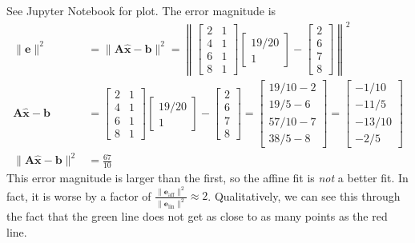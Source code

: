 \documentclass[]{article}
\renewcommand{\vec}[1]{\bm{#1}}
\newcommand{\unit}[1]{\vec{\hat{#1}}}
\begin{document}
See Jupyter Notebook for plot. 
The error magnitude is
\begin{align}
	\|\vec{e}\|^2 &= \|\vec{A} \unit{x} - \vec{b}\|^2 = \left\|\begin{bmatrix}
	2 & 1 \\
	4 & 1 \\
	6 & 1 \\
	8 & 1
	\end{bmatrix}
	\begin{bmatrix}
	19 / 20 \\
	1
	\end{bmatrix} - \begin{bmatrix}
	2 \\
	6 \\
	7 \\
	8
	\end{bmatrix}\right\|^2 \\
	\vec{A} \unit{x} - \vec{b} &= 
	\begin{bmatrix}
	2 & 1 \\
	4 & 1 \\
	6 & 1 \\
	8 & 1
	\end{bmatrix}
	\begin{bmatrix}
	19 / 20 \\
	1
	\end{bmatrix} - \begin{bmatrix}
	2 \\
	6 \\
	7 \\
	8
	\end{bmatrix} = \begin{bmatrix}
	19/10 - 2 \\
	19/5 - 6 \\
	57/10 - 7 \\
	38/5 - 8
	\end{bmatrix} = 
	\begin{bmatrix}
	-1 / 10 \\
	-11 / 5 \\
	-13 / 10 \\
	-2 / 5
	\end{bmatrix} \\
	\|\vec{A} \unit{x} - \vec{b}\|^2 &= \frac{67}{10}
\end{align}
This error magnitude is larger than the first, so the affine fit is \emph{not} a better fit. 
In fact, it is worse by a factor of \(\frac{\|\vec{e}_{\text{aff}}\|^2}{\|\vec{e}_{\text{lin}}\|^2} \approx 2\). 
Qualitatively, we can see this through the fact that the green line does not get as close to as many points as the red line. 
\end{document}
